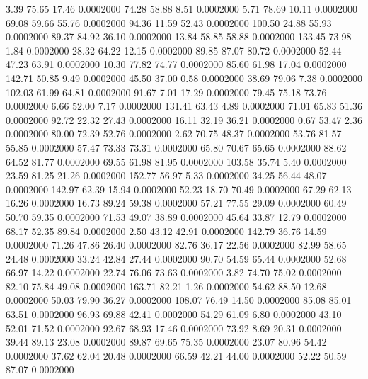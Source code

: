    3.39   75.65   17.46   0.0002000
  74.28   58.88    8.51   0.0002000
   5.71   78.69   10.11   0.0002000
  69.08   59.66   55.76   0.0002000
  94.36   11.59   52.43   0.0002000
 100.50   24.88   55.93   0.0002000
  89.37   84.92   36.10   0.0002000
  13.84   58.85   58.88   0.0002000
 133.45   73.98    1.84   0.0002000
  28.32   64.22   12.15   0.0002000
  89.85   87.07   80.72   0.0002000
  52.44   47.23   63.91   0.0002000
  10.30   77.82   74.77   0.0002000
  85.60   61.98   17.04   0.0002000
 142.71   50.85    9.49   0.0002000
  45.50   37.00    0.58   0.0002000
  38.69   79.06    7.38   0.0002000
 102.03   61.99   64.81   0.0002000
  91.67    7.01   17.29   0.0002000
  79.45   75.18   73.76   0.0002000
   6.66   52.00    7.17   0.0002000
 131.41   63.43    4.89   0.0002000
  71.01   65.83   51.36   0.0002000
  92.72   22.32   27.43   0.0002000
  16.11   32.19   36.21   0.0002000
   0.67   53.47    2.36   0.0002000
  80.00   72.39   52.76   0.0002000
   2.62   70.75   48.37   0.0002000
  53.76   81.57   55.85   0.0002000
  57.47   73.33   73.31   0.0002000
  65.80   70.67   65.65   0.0002000
  88.62   64.52   81.77   0.0002000
  69.55   61.98   81.95   0.0002000
 103.58   35.74    5.40   0.0002000
  23.59   81.25   21.26   0.0002000
 152.77   56.97    5.33   0.0002000
  34.25   56.44   48.07   0.0002000
 142.97   62.39   15.94   0.0002000
  52.23   18.70   70.49   0.0002000
  67.29   62.13   16.26   0.0002000
  16.73   89.24   59.38   0.0002000
  57.21   77.55   29.09   0.0002000
  60.49   50.70   59.35   0.0002000
  71.53   49.07   38.89   0.0002000
  45.64   33.87   12.79   0.0002000
  68.17   52.35   89.84   0.0002000
   2.50   43.12   42.91   0.0002000
 142.79   36.76   14.59   0.0002000
  71.26   47.86   26.40   0.0002000
  82.76   36.17   22.56   0.0002000
  82.99   58.65   24.48   0.0002000
  33.24   42.84   27.44   0.0002000
  90.70   54.59   65.44   0.0002000
  52.68   66.97   14.22   0.0002000
  22.74   76.06   73.63   0.0002000
   3.82   74.70   75.02   0.0002000
  82.10   75.84   49.08   0.0002000
 163.71   82.21    1.26   0.0002000
  54.62   88.50   12.68   0.0002000
  50.03   79.90   36.27   0.0002000
 108.07   76.49   14.50   0.0002000
  85.08   85.01   63.51   0.0002000
  96.93   69.88   42.41   0.0002000
  54.29   61.09    6.80   0.0002000
  43.10   52.01   71.52   0.0002000
  92.67   68.93   17.46   0.0002000
  73.92    8.69   20.31   0.0002000
  39.44   89.13   23.08   0.0002000
  89.87   69.65   75.35   0.0002000
  23.07   80.96   54.42   0.0002000
  37.62   62.04   20.48   0.0002000
  66.59   42.21   44.00   0.0002000
  52.22   50.59   87.07   0.0002000
